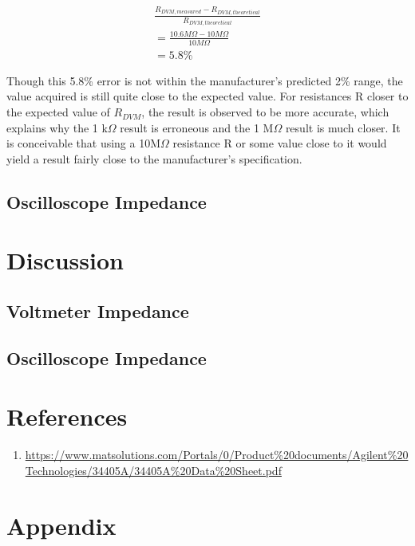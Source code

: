 \documentclass[a4paper,titlepage,10pt]{article}
\begin{document}
\begin{equation}
	\label{eq:vdvm_error}
	\begin{gathered}
		\frac{R_{DVM, measured} - R_{DVM, theoretical}}{R_{DVM, theoretical}}\\
	= \frac{10.6 M\Omega - 10 M\Omega}{10 M\Omega}\\
	= 5.8\%
	\end{gathered}
\end{equation}

Though this 5.8\% error is not within the manufacturer's predicted 2\% range, the value acquired is still quite close to the expected value. For resistances R closer to the expected value of $R_{DVM}$, the result is observed to be more accurate, which explains why the 1 k$\Omega$ result is erroneous and the 1 M$\Omega$ result is much closer. It is conceivable that using a 10M$\Omega$ resistance R or some value close to it would yield a result fairly close to the manufacturer's specification.

\subsection{Oscilloscope Impedance}


\section{Discussion}
\subsection{Voltmeter Impedance}

\subsection{Oscilloscope Impedance}


\section{References}
\begin{enumerate}
	\item \label{itm:34405A} \url{https://www.matsolutions.com/Portals/0/Product%20documents/Agilent%20Technologies/34405A/34405A%20Data%20Sheet.pdf}
\end{enumerate}

\section{Appendix}

\end{document}
